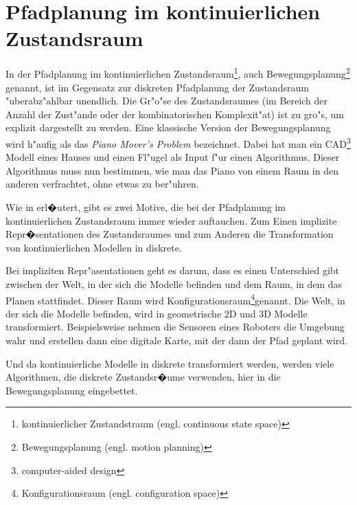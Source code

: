 \section{Pfadplanung im kontinuierlichen Zustandsraum} \label{Kapitel 4.4}
In der Pfadplanung im kontinuierlichen Zustandsraum\footnote{kontinuierlicher Zustandstraum (engl. continuous state space)}, auch Bewegungsplanung\footnote{Bewegungsplanung (engl. motion planning)} genannt, ist im Gegensatz zur diskreten Pfadplanung der Zustandsraum "uberabz"ahlbar unendlich. Die Gr"o"se des Zustandsraumes (im Bereich der Anzahl der Zust"ande oder der kombinatorischen Komplexit"at) ist zu gro"s, um explizit dargestellt zu werden. \cite[~S. 17]{Lav06}
Eine klassische Version der Bewegungsplanung wird h"aufig als das \textit{Piano Mover's Problem} bezeichnet. Dabei hat man ein CAD\footnote{computer-aided design} Modell eines Hauses und einen Fl"ugel als Input f"ur einen Algorithmus. Dieser Algorithmus muss nun bestimmen, wie man das Piano von einem Raum in den anderen verfrachtet, ohne etwas zu ber"uhren. %

Wie in \cite[~S. 79 f.]{Lav06} erl�utert, gibt es zwei Motive, die bei der Pfadplanung im kontinuierlichen Zustandsraum immer wieder auftauchen. Zum Einen implizite Repr�sentationen des Zustandsraumes und zum Anderen die Transformation von kontinuierlichen Modellen in diskrete.

Bei impliziten Repr"asentationen geht es darum, dass es einen Unterschied gibt zwischen der Welt, in der sich die Modelle befinden und dem Raum, in dem das Planen stattfindet. Dieser Raum wird Konfigurationsraum\footnote{Konfigurationsraum (engl. configuration space)}genannt. Die Welt, in der sich die Modelle befinden, wird in geometrische 2D und 3D Modelle transformiert. Beispielsweise nehmen die Sensoren eines Roboters die Umgebung wahr und erstellen dann eine digitale Karte, mit der dann der Pfad geplant wird.

Und da kontinuierliche Modelle in diskrete transformiert werden, werden viele Algorithmen, die diskrete Zustandsr�ume verwenden, hier in die Bewegungsplanung eingebettet.


%
%

